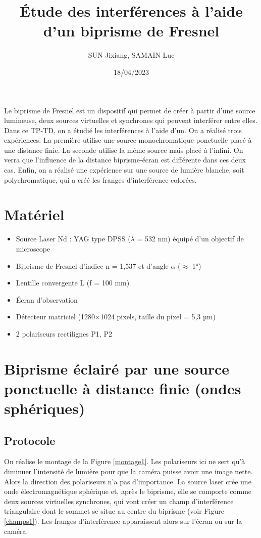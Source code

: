 \documentclass[11pt, a4paper]{article}
\title{Étude des interférences à l'aide d'un biprisme de Fresnel}
\author{SUN Jixiang, SAMAIN Luc}
\date{18/04/2023}
\begin{document}
\maketitle
\thispagestyle{fancy}

Le biprisme de Fresnel est un dispositif qui permet de créer à partir d'une source lumineuse, deux sources virtuelles et synchrones qui peuvent interférer entre elles. Dans ce TP-TD, on a étudié les interférences à l'aide d'un. On a réalisé trois expériences. La première utilise une source monochromatique ponctuelle placé à une distance finie. La seconde utilise la même source mais placé à l'infini. On verra que l'influence de la distance biprisme-écran est différente dans ces deux cas. Enfin, on a réalisé une expérience sur une source de lumière blanche, soit polychromatique, qui a créé les franges d'interférence colorées.

\section{Matériel}
\begin{itemize}
    \item Source Laser Nd : YAG type DPSS ($\lambda$ = 532 nm) équipé d'un objectif de microscope
    \item Biprisme de Fresnel d'indice n = 1,537 et d'angle $\alpha$ ($\approx$ 1°)
    \item Lentille convergente L (f = 100 mm)
    \item Écran d'observation
    \item Détecteur matriciel (1280$\times$1024 pixels, taille du pixel = 5,3 µm)
    \item 2 polariseurs rectilignes P1, P2
\end{itemize}


\section{Biprisme éclairé par une source ponctuelle à distance finie (ondes sphériques)}
\subsection{Protocole}
On réalise le montage de la Figure \ref{montage1}. Les polariseurs ici ne sert qu'à diminuer l'intensité de lumière pour que la caméra puisse avoir une image nette. Alors la direction des polariseurs n'a pas d'importance. La source laser crée une onde électromagnétique sphérique et, après le biprisme, elle se comporte comme deux sources virtuelles synchrones, qui vont créer un champ d'interférence triangulaire dont le sommet se situe au centre du biprisme (voir Figure \ref{champs1}). Les franges d'interférence apparaissent alors sur l'écran ou sur la caméra.
\end{document}

